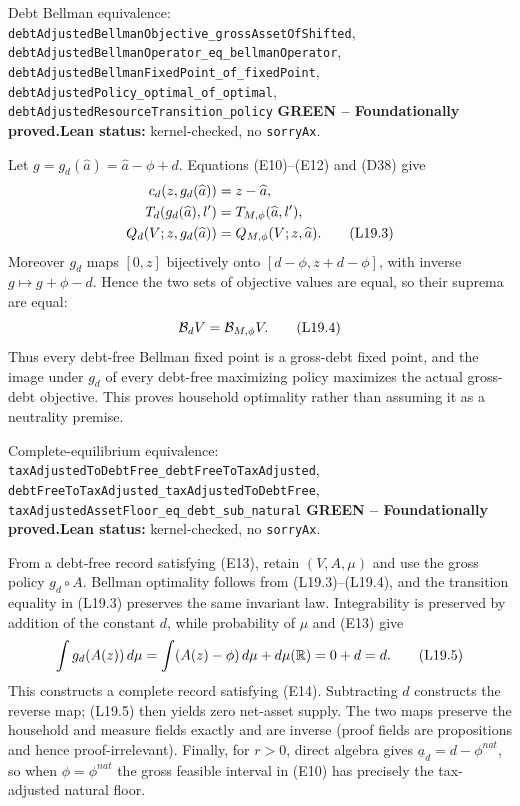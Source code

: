 \documentclass[11pt]{article}
\newcommand{\leanname}[1]{\nolinkurl{#1}}
\newcommand{\eqL}[1]{\refstepcounter{equation}\tag{L#1}}
\newcommand{\formalcheck}{\textbf{Lean status:} kernel-checked, no \texttt{sorryAx}.}
\newcommand{\greenstatus}{\textcolor{proved}{\textbf{GREEN -- Foundationally proved.}}}
\begin{document}
\begin{greenbox}{Debt Bellman equivalence:
\leanname{debtAdjustedBellmanObjective_grossAssetOfShifted},
\leanname{debtAdjustedBellmanOperator_eq_bellmanOperator},
\leanname{debtAdjustedBellmanFixedPoint_of_fixedPoint},
\leanname{debtAdjustedPolicy_optimal_of_optimal},
\leanname{debtAdjustedResourceTransition_policy}}
\greenstatus\quad\formalcheck

Let \(g=g_d(\widehat a)=\widehat a-\phi+d\).  Equations (E10)--(E12) and
(D38) give
\begin{align}
 c_d(z,g_d(\widehat a))&=z-\widehat a, \notag\\
 T_d(g_d(\widehat a),l')&=T_{M,\phi}(\widehat a,l'), \notag\\
 Q_d(V;z,g_d(\widehat a))&=Q_{M,\phi}(V;z,\widehat a). \eqL{19.3}\label{L19.3}
\end{align}
Moreover \(g_d\) maps \([0,z]\) bijectively onto
\([d-\phi,z+d-\phi]\), with inverse \(g\mapsto g+\phi-d\).  Hence the two
sets of objective values are equal, so their suprema are equal:
\begin{equation}
 \mathcal B_dV=\mathcal B_{M,\phi}V. \eqL{19.4}\label{L19.4}
\end{equation}
Thus every debt-free Bellman fixed point is a gross-debt fixed point, and the
image under \(g_d\) of every debt-free maximizing policy maximizes the actual
gross-debt objective.  This proves household optimality rather than assuming
it as a neutrality premise.
\end{greenbox}

\begin{greenbox}{Complete-equilibrium equivalence:
\leanname{taxAdjustedToDebtFree_debtFreeToTaxAdjusted},
\leanname{debtFreeToTaxAdjusted_taxAdjustedToDebtFree},
\leanname{taxAdjustedAssetFloor_eq_debt_sub_natural}}
\greenstatus\quad\formalcheck

From a debt-free record satisfying (E13), retain \((V,A,\mu)\) and use the
gross policy \(g_d\circ A\).  Bellman optimality follows from (L19.3)--(L19.4),
and the transition equality in (L19.3) preserves the same invariant law.
Integrability is preserved by addition of the constant \(d\), while
probability of \(\mu\) and (E13) give
\begin{equation}
 \int g_d(A(z))\,d\mu
 =\int(A(z)-\phi)\,d\mu+d\mu(\mathbb R)=0+d=d. \eqL{19.5}\label{L19.5}
\end{equation}
This constructs a complete record satisfying (E14).  Subtracting \(d\)
constructs the reverse map; (L19.5) then yields zero net-asset supply.  The two
maps preserve the household and measure fields exactly and are inverse (proof
fields are propositions and hence proof-irrelevant).  Finally, for \(r>0\),
direct algebra gives
\(\underline a_d=d-\phi^{nat}\), so when \(\phi=\phi^{nat}\) the gross
feasible interval in (E10) has precisely the tax-adjusted natural floor.
\end{greenbox}
\end{document}

